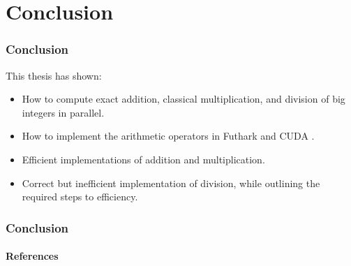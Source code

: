 \section{Conclusion}
\begin{frame}
  \frametitle{Conclusion}
  This thesis has shown:
  \begin{itemize}
  \item How to compute exact addition, classical multiplication, and division of
    big integers in parallel.  \pause
  \item How to implement the arithmetic operators in Futhark and CUDA \cpp.
    \pause
  \item Efficient implementations of addition and multiplication.  \pause
  \item Correct but inefficient implementation of division, while outlining the
    required steps to efficiency.
  \end{itemize}
\end{frame}
\begin{frame}%
  \scriptsize
  \frametitle{Conclusion}
  \framesubtitle{References}
    
\end{frame}

